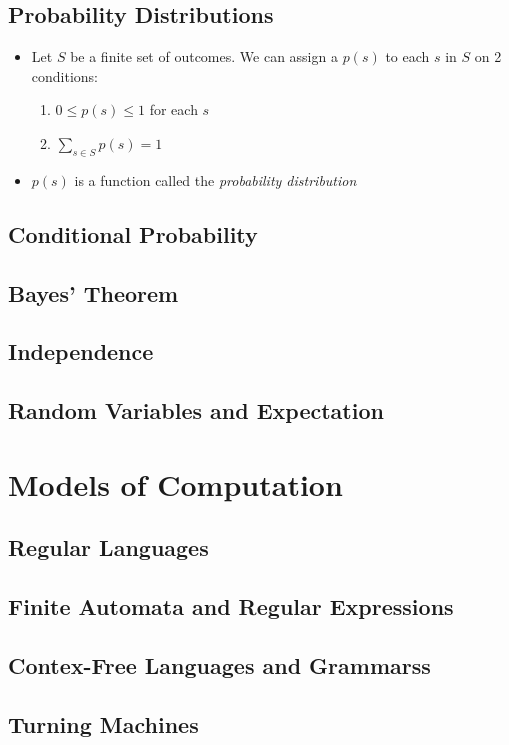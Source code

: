 \documentclass[a4paper]{article}
\begin{document}
\begin{multicols}{2}
\begin{itemize}
	\subsection{Probability Distributions}
	\begin{itemize}
		\item Let $S$ be a finite set of outcomes. We can assign a $p(s)$ to each $s$ in $S$ on 2 conditions:
		\begin{enumerate}
			\item $0 \leq p(s) \leq 1$ for each $s$
			\item $\sum_{s \in S}p(s) = 1$
		\end{enumerate}
		\item $p(s)$ is a function called the \textit{probability distribution}
	\end{itemize}
	\subsection{Conditional Probability}
	\subsection{Bayes' Theorem}
	\subsection{Independence}
	\subsection{Random Variables and Expectation}

	\section{Models of Computation}
	\subsection{Regular Languages}
	\subsection{Finite Automata and Regular Expressions}
	\subsection{Contex-Free Languages and Grammarss}
	\subsection{Turning Machines}


\end{itemize}
\end{multicols}
\end{document}
